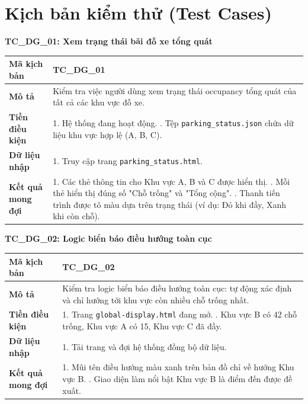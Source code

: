 \newpage
\section{Kịch bản kiểm thử (Test Cases)}


\textbf{TC\_DG\_01: Xem trạng thái bãi đỗ xe tổng quát}
\begin{table}[H]
    \centering
    \begin{tabularx}{\textwidth}{|l|X|}
        \hline
        \rowcolor[HTML]{EFEFEF} 
        \textbf{Mã kịch bản} & \textbf{TC\_DG\_01} \\ \hline
        \textbf{Mô tả} & Kiểm tra việc người dùng xem trạng thái occupancy tổng quát của tất cả các khu vực đỗ xe. \\ \hline
        \textbf{Tiền điều kiện} & 1. Hệ thống đang hoạt động. \newline 2. Tệp \texttt{parking\_status.json} chứa dữ liệu khu vực hợp lệ (A, B, C). \\ \hline
        \textbf{Dữ liệu nhập} & 1. Truy cập trang \texttt{parking\_status.html}. \\ \hline
        \textbf{Kết quả mong đợi} & 1. Các thẻ thông tin cho Khu vực A, B và C được hiển thị. \newline 2. Mỗi thẻ hiển thị đúng số "Chỗ trống" và "Tổng cộng". \newline 3. Thanh tiến trình được tô màu dựa trên trạng thái (ví dụ: Đỏ khi đầy, Xanh khi còn chỗ). \\ \hline
    \end{tabularx}
\end{table}

\textbf{TC\_DG\_02: Logic biển báo điều hướng toàn cục}
\begin{table}[H]
    \centering
    \begin{tabularx}{\textwidth}{|l|X|}
        \hline
        \rowcolor[HTML]{EFEFEF} 
        \textbf{Mã kịch bản} & \textbf{TC\_DG\_02} \\ \hline
        \textbf{Mô tả} & Kiểm tra logic biển báo điều hướng toàn cục: tự động xác định và chỉ hướng tới khu vực còn nhiều chỗ trống nhất. \\ \hline
        \textbf{Tiền điều kiện} & 1. Trang \texttt{global-display.html} đang mở. \newline 2. Khu vực B có 42 chỗ trống, Khu vực A có 15, Khu vực C đã đầy. \\ \hline
        \textbf{Dữ liệu nhập} & 1. Tải trang và đợi hệ thống đồng bộ dữ liệu. \\ \hline
        \textbf{Kết quả mong đợi} & 1. Mũi tên điều hướng màu xanh trên bản đồ chỉ về hướng Khu vực B. \newline 2. Giao diện làm nổi bật Khu vực B là điểm đến được đề xuất. \\ \hline
    \end{tabularx}
\end{table}


